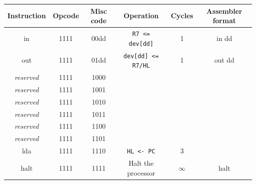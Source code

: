 \documentclass[13pt,a4paper]{report}
\begin{document}
\begin{center}
\begin{tabular}{|c|c|c|c|c|c|}
\hline 
Instruction & Opcode & Misc code & Operation & Cycles & Assembler format \\ 
\hline 
in & 1111 & 00dd & \texttt{R7 <= dev[dd]} & 1 & in dd \\ \hline 
out & 1111 & 01dd & \texttt{dev[dd] <= R7/HL} & 1 & out dd \\ \hline
\textit{reserved} & 1111 & 1000 &  &  &  \\ \hline
\textit{reserved} & 1111 & 1001 &  &  &  \\ \hline
\textit{reserved} & 1111 & 1010 &  &  &  \\ \hline
\textit{reserved} & 1111 & 1011 &  &  &  \\ \hline
\textit{reserved} & 1111 & 1100 &  &  &  \\ \hline
\textit{reserved} & 1111 & 1101 &  &  &  \\ \hline
lda & 1111 & 1110 & \texttt{HL <- PC} & 3 &  \\ \hline
halt & 1111 & 1111 & Halt the processor & $\infty$ & halt \\ \hline
\end{tabular}
\end{center}
\end{document}
